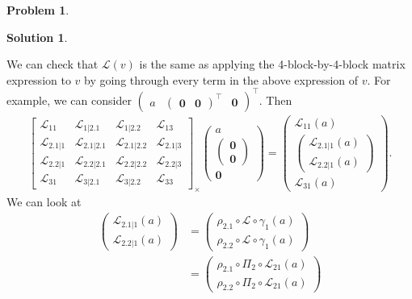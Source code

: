 \documentclass{book}
\theoremstyle{definition}
\newtheorem*{prob*}{Problem}
\newtheorem*{sln*}{Solution}
\newcommand{\lag}{\mathcal{L}}
\begin{document}
\begin{prob*}
\begin{sln*}
\begin{enumerate}
		We can check that $\lag(v)$ is the same as applying the 4-block-by-4-block matrix expression to $v$ by going through every term in the above expression of $v$. For example, we can consider $\begin{pmatrix}
		a & \begin{pmatrix}
		\mathbf{0} & \mathbf{0}
		\end{pmatrix}^\top & \mathbf{0}
		\end{pmatrix}^\top$. Then
		\begin{align*}
		\begin{bmatrix}
		\lag_{11} & \lag_{1|2.1} & \lag_{1|2.2} & \lag_{13}\\
		\lag_{2.1|1} & \lag_{2.1|2.1} & \lag_{2.1|2.2} & \lag_{2.1|3}\\
		\lag_{2.2|1} & \lag_{2.2|2.1} & \lag_{2.2|2.2} & \lag_{2.2|3}\\
		\lag_{31} & \lag_{3|2.1} & \lag_{3|2.2} & \lag_{33}
		\end{bmatrix}_\times \begin{pmatrix}
		a \\ \begin{pmatrix}
		\mathbf{0}\\\mathbf{0}
		\end{pmatrix}\\
		\mathbf{0}
		\end{pmatrix} = \begin{pmatrix}
		\lag_{11}(a)\\
		\begin{pmatrix}
		\lag_{2.1|1}(a)\\
		\lag_{2.2|1}(a)
		\end{pmatrix}\\
		\lag_{31}(a)
		\end{pmatrix}.
		\end{align*}
		We can look at 
		\begin{align*}
		\begin{pmatrix}
		\lag_{2.1|1}(a)\\
		\lag_{2.2|1}(a)
		\end{pmatrix} &= 
		\begin{pmatrix}
		\rho_{2.1} \circ  \lag \circ \gamma_1(a)\\
		\rho_{2.2} \circ  \lag \circ \gamma_1(a)
		\end{pmatrix}\\
		&=
		\begin{pmatrix}
		\rho_{2.1} \circ \Pi_2 \circ \lag_{21}(a)\\
		\rho_{2.2} \circ \Pi_2 \circ \lag_{21}(a)

\end{pmatrix}
\end{align*}
\end{enumerate}
\end{sln*}
\end{prob*}
\end{document}
